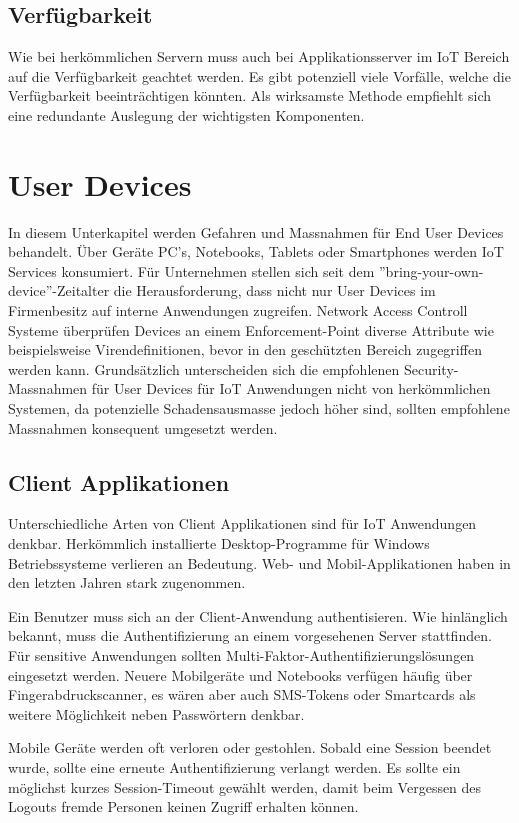 \subsection{Verfügbarkeit}
Wie bei herkömmlichen Servern muss auch bei Applikationsserver im IoT Bereich auf die Verfügbarkeit geachtet werden. Es gibt potenziell viele Vorfälle, welche die Verfügbarkeit beeinträchtigen könnten. Als wirksamste Methode empfiehlt sich eine redundante Auslegung der wichtigsten Komponenten.

\section{User Devices}
In diesem Unterkapitel werden Gefahren und Massnahmen für End User Devices behandelt. Über Geräte PC's, Notebooks, Tablets oder Smartphones werden IoT Services konsumiert. Für Unternehmen stellen sich seit dem ''bring-your-own-device''-Zeitalter die Herausforderung, dass nicht nur User Devices im Firmenbesitz auf interne Anwendungen zugreifen. Network Access Controll Systeme überprüfen Devices an einem Enforcement-Point diverse Attribute wie beispielsweise Virendefinitionen, bevor in den geschützten Bereich zugegriffen werden kann. Grundsätzlich unterscheiden sich die empfohlenen Security-Massnahmen für User Devices für IoT Anwendungen nicht von herkömmlichen Systemen, da potenzielle Schadensausmasse jedoch höher sind, sollten empfohlene Massnahmen konsequent umgesetzt werden.

\subsection{Client Applikationen}
Unterschiedliche Arten von Client Applikationen sind für IoT Anwendungen denkbar. Herkömmlich installierte Desktop-Programme für Windows Betriebssysteme verlieren an Bedeutung. Web- und Mobil-Applikationen haben in den letzten Jahren stark zugenommen. 

Ein Benutzer muss sich an der Client-Anwendung authentisieren. Wie hinlänglich bekannt, muss die Authentifizierung an einem vorgesehenen Server stattfinden. Für sensitive Anwendungen sollten Multi-Faktor-Authentifizierungslösungen eingesetzt werden. Neuere Mobilgeräte und Notebooks verfügen häufig über Fingerabdruckscanner, es wären aber auch SMS-Tokens oder Smartcards als weitere Möglichkeit neben Passwörtern denkbar.

Mobile Geräte werden oft verloren oder gestohlen. Sobald eine Session beendet wurde, sollte eine erneute Authentifizierung verlangt werden. Es sollte ein möglichst kurzes Session-Timeout gewählt werden, damit beim Vergessen des Logouts fremde Personen keinen Zugriff erhalten können.

